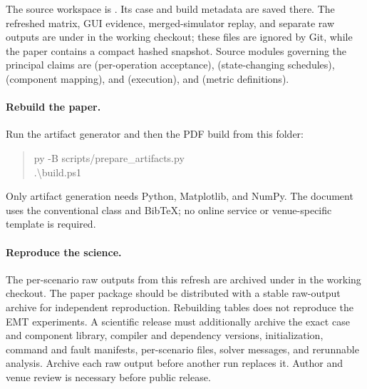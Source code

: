 The source workspace is .
Its case and build metadata are saved there. The refreshed matrix, GUI evidence,
merged-simulator replay, and separate raw outputs are under
 in the working checkout; these files are
ignored by Git, while the paper contains a compact hashed snapshot.
Source modules governing the principal claims are
 (per-operation acceptance), 
(state-changing schedules),  (component mapping),
 and  (execution),
and  (metric definitions).

\paragraph{Rebuild the paper.}
Run the artifact generator and then the PDF build from this folder:
\begin{quote}\small\ttfamily
py -B scripts/prepare\_artifacts.py\\
.\textbackslash build.ps1
\end{quote}
Only artifact generation needs Python, Matplotlib, and NumPy. The document
uses the conventional  class and BibTeX; no online service or
venue-specific template is required.

\paragraph{Reproduce the science.}
The per-scenario raw outputs from this refresh are archived under
 in the working checkout. The paper
package should be distributed with a stable raw-output archive for independent
reproduction.
Rebuilding tables does not reproduce the EMT experiments. A scientific release
must additionally archive the exact case and component library, compiler and
dependency versions, initialization, command and fault manifests, per-scenario
 files, solver messages, and rerunnable analysis. Archive each raw
output before another run replaces it. Author and venue review is necessary
before public release.
